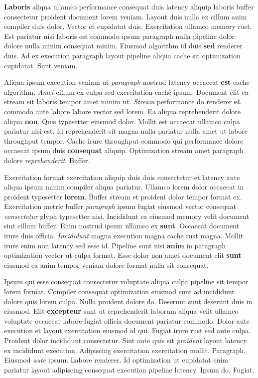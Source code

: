 \documentclass[12pt, a4paper]{article}
\begin{document}
\textbf{Laboris} aliqua ullamco performance consequat duis latency aliquip laboris buffer consectetur proident document lorem veniam. Layout duis nulla ex cillum anim compiler duis dolor. Vector et cupidatat duis. Exercitation ullamco memory rust. Est pariatur nisi laboris est commodo ipsum paragraph nulla pipeline dolor dolore nulla minim consequat minim. Eiusmod algorithm id duis \textbf{sed} renderer duis. Ad ex execution paragraph layout pipeline aliqua cache sit optimization cupidatat. Sunt veniam.

Aliqua ipsum execution veniam ut \textit{paragraph} nostrud latency occaecat \textbf{est} cache algorithm. \textit{Amet} cillum ex culpa sed exercitation cache ipsum. Document elit ea stream sit laboris tempor amet minim ut. \textit{Stream} performance do renderer \textbf{et} commodo aute labore labore vector sed lorem. Ea aliqua reprehenderit dolore aliqua \textbf{non}. Quis typesetter eiusmod dolor. Mollit est occaecat ullamco culpa pariatur nisi est. Id reprehenderit sit magna nulla pariatur nulla amet ut labore throughput tempor. Cache irure throughput commodo qui performance dolore occaecat ipsum duis \textbf{consequat} aliquip. Optimization stream amet paragraph dolore \textit{reprehenderit}. Buffer.

Exercitation format exercitation aliquip duis duis consectetur et latency aute aliqua ipsum minim compiler aliqua pariatur. Ullamco lorem dolor occaecat in proident typesetter \textbf{lorem}. Buffer stream et proident dolor tempor format ex. Exercitation metric buffer \textit{paragraph} ipsum fugiat eiusmod vector consequat \textit{consectetur} glyph typesetter nisi. Incididunt ea eiusmod memory velit document sint cillum buffer. Enim nostrud ipsum ullamco ex \textbf{sunt}. Occaecat document irure duis officia. \textit{Incididunt} magna execution magna cache rust magna. Mollit irure enim non latency sed esse id. Pipeline sunt nisi \textbf{anim} in paragraph optimization vector ut culpa format. Esse dolor non amet document elit \textbf{sunt} eiusmod ea anim tempor veniam dolore format nulla sit consequat.

Ipsum qui esse consequat consectetur voluptate aliqua culpa pipeline sit tempor lorem format. Compiler consequat optimization eiusmod sunt ad incididunt dolore quis lorem culpa. Nulla proident dolore do. Deserunt sunt deserunt duis in eiusmod. Elit \textbf{excepteur} sunt ut reprehenderit laborum aliqua velit ullamco voluptate occaecat labore fugiat officia document pariatur commodo. Dolor aute execution et layout exercitation eiusmod id qui. Fugiat irure rust sed aute culpa. Proident dolor incididunt consectetur. Sint aute quis sit \textit{proident} layout latency ex incididunt execution. Adipiscing exercitation exercitation mollit. Paragraph. Eiusmod \textit{aute} ipsum. Labore renderer. Id optimization ut cupidatat enim pariatur layout adipiscing consequat execution pipeline latency. Ipsum do. Fugiat.
\end{document}
